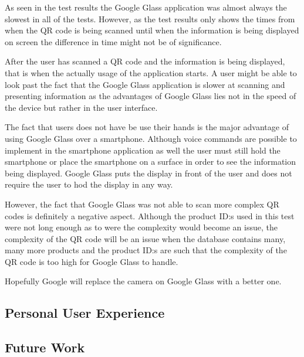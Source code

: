 As seen in the test results the Google Glass application was almost always the slowest in all of the tests. However, as the test results only shows the times from when the QR code is being scanned until when the information is being displayed on screen the difference in time might not be of significance. 

After the user has scanned a QR code and the information is being displayed, that is when the actually usage of the application starts. A user might be able to look past the fact that the Google Glass application is slower at scanning and presenting information as the advantages of Google Glass lies not in the speed of the device but rather in the user interface.

The fact that users does not have be use their hands is the major advantage of using Google Glass over a smartphone. Although voice commands are possible to implement in the smartphone application as well the user must still hold the smartphone or place the smartphone on a surface in order to see the information being displayed. Google Glass puts the display in front of the user and does not require the user to hod the display in any way.

However, the fact that Google Glass was not able to scan more complex QR codes is definitely a negative aspect. Although the product ID:s used in this test were not long enough as to were the complexity would become an issue, the complexity of the QR code will be an issue when the database contains many, many more products and the product ID:s are such that the complexity of the QR code is too high for Google Glass to handle.

Hopefully Google will replace the camera on Google Glass with a better one. 

\subsection{Personal User Experience}


\subsection{Future Work}
\label{subsec:futurework}
